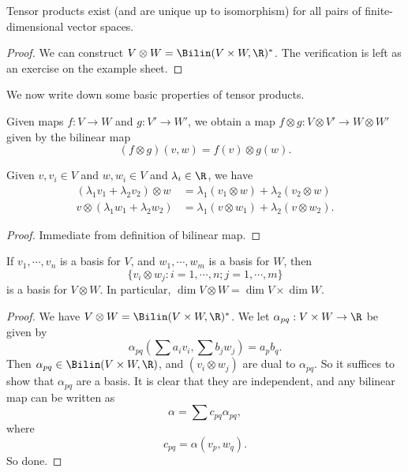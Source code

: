 \documentclass[a4paper]{article}
\begin{document}
\begin{lemma}
  Tensor products exist (and are unique up to isomorphism) for all pairs of finite-dimensional vector spaces.
\end{lemma}

\begin{proof}
  We can construct $V \otimes W = \Bilin(V \times W, \R)^*$. The verification is left as an exercise on the example sheet.
\end{proof}

We now write down some basic properties of tensor products.
\begin{prop}
  Given maps $f: V \to W$ and $g: V' \to W'$, we obtain a map $f \otimes g: V \otimes V' \to W \otimes W'$ given by the bilinear map
  \[
    (f \otimes g)(v, w) = f(v) \otimes g(w).
  \]
\end{prop}

\begin{lemma}
  Given $v, v_i \in V$ and $w, w_i \in V$ and $\lambda_i \in \R$, we have
  \begin{align*}
    (\lambda_1 v_1 + \lambda_2 v_2) \otimes w &= \lambda_1 (v_1 \otimes w) + \lambda_2 (v_2 \otimes w)\\
    v \otimes (\lambda_1 w_1 + \lambda_2 w_2) &= \lambda_1 (v \otimes w_1) + \lambda_2 (v \otimes w_2).
  \end{align*}
\end{lemma}

\begin{proof}
  Immediate from definition of bilinear map.
\end{proof}

\begin{lemma}
  If $v_1,\cdots, v_n$ is a basis for $V$, and $w_1, \cdots, w_m$ is a basis for $W$, then
  \[
    \{v_i \otimes w_j: i = 1, \cdots, n; j = 1, \cdots, m\}
  \]
  is a basis for $V \otimes W$. In particular, $\dim V \otimes W = \dim V \times \dim W$.
\end{lemma}

\begin{proof}
  We have $V \otimes W = \Bilin(V \times W, \R)^*$. We let $\alpha_{pq}:V \times W \to \R$ be given by
  \[
    \alpha_{pq}\left(\sum a_i v_i, \sum b_j w_j\right) = a_p b_q.
  \]
  Then $\alpha_{pq} \in \Bilin(V\times W, \R)$, and $(v_i \otimes w_j)$ are dual to $\alpha_{pq}$. So it suffices to show that $\alpha_{pq}$ are a basis. It is clear that they are independent, and any bilinear map can be written as
  \[
    \alpha = \sum c_{pq}\alpha_{pq},
  \]
  where
  \[
    c_{pq} = \alpha(v_p, w_q).
  \]
  So done.
\end{proof}
\end{document}

